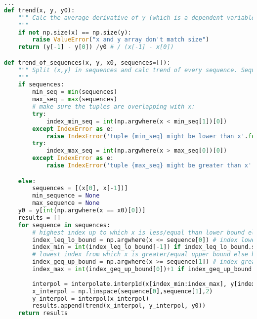 \begin{lstlisting}[language=python, caption=Auszug aus \texttt{trendanalyse.py}, label=lst:Trendanalyse,frame=single,framerule=0pt]
...
def trend(x, y, y0):
    """ Calc the average derivative of y (which is a dependent variable on x) related to y0
    """
    if not np.size(x) == np.size(y):
        raise ValueError("x and y array don't match size")
    return (y[-1] - y[0]) /y0 # / (x[-1] - x[0])

def trend_of_sequences(x, y, x0, sequences=[]):
    """ Split (x,y) in sequences and calc trend of every sequence. Sequences are given as list of tuples with x values. In Case a tuple is partly not in x the transient will be interpolated. 
    """
    if sequences:
        min_seq = min(sequences)
        max_seq = max(sequences)
        # make sure the tuples are overlapping with x:
        try:
            index_min_seq = int(np.argwhere(x < min_seq[1])[0])
        except IndexError as e:
            raise IndexError('tuple {min_seq} might be lower than x'.format(min_seq=repr(min_seq))) from e
        try:
            index_max_seq = int(np.argwhere(x > max_seq[0])[0])
        except IndexError as e:
            raise IndexError('tuple {max_seq} might be greater than x'.format(max_seq=repr(max_seq))) from e

    else:
        sequences = [(x[0], x[-1])]
        min_sequence = None
        max_sequence = None
    y0 = y[int(np.argwhere(x == x0)[0])]
    results = []
    for sequence in sequences:
        # highest index up to which x is less/equal than lower bound else lowest index of x:
        index_leq_lo_bound = np.argwhere(x <= sequence[0]) # index lower/equal lower bound
        index_min = int(index_leq_lo_bound[-1]) if index_leq_lo_bound.size > 0 else 0
        # lowest index from which x is greater/equal upper bound else highest index of x:
        index_geq_up_bound = np.argwhere(x >= sequence[1]) # index greater/equal upper bound
        index_max = int(index_geq_up_bound[0])+1 if index_geq_up_bound.size > 0 else None # NOTE: ``int(...)+1`` scince numpy _ex_cludes last element when slicing 
        
        interpol = interpolate.interp1d(x[index_min:index_max], y[index_min:index_max], fill_value='extrapolate')
        x_interpol = np.linspace(sequence[0],sequence[1],2)
        y_interpol = interpol(x_interpol)
        results.append(trend(x_interpol, y_interpol, y0))
    return results
\end{lstlisting}

